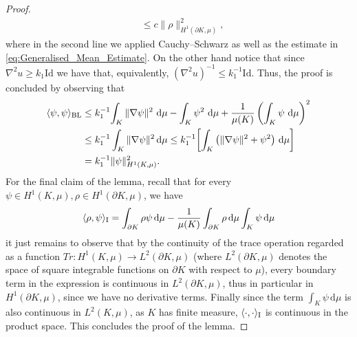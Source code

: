 \documentclass[a4paper, 11pt]{article}
\theoremstyle{definition}
\newcommand{\di}{\, \mathrm{d}}
\begin{document}
\begin{proof}
\begin{align*}
    &\leq c \|\rho\|^2_{H^{1}(\partial K,\mu)},
\end{align*}
where in the second line we applied Cauchy--Schwarz as well as the estimate in \eqref{eq:Generalised_Mean_Estimate}. On the other hand notice that since $\nabla^2u \geq k_{1}\mathrm{Id}$ we have that, equivalently, $(\nabla^2u)^{-1} \leq k^{-1}_{1}\mathrm{Id}$. Thus, the proof is concluded by observing that
\begin{align}\label{eq:Prop 3.1.1}
        \notag 
        \langle \psi,\psi \rangle_{\rm BL}
        &\leq k^{-1}_1\!\int_{K}\|\nabla \psi \|^2 \, \di\mu
            - \int_{K}\psi^2\, \di\mu
            + \frac{1}{\mu(K)}\left(\int_{K}\psi \, \di\mu\right)^2  
        \\
        \notag
        &\leq k^{-1}_1\int_{K} \|\nabla\psi\|^2 \di \mu \leq k^{-1}_1\!\left[\int_{K} \big(\|\nabla\psi\|^2 + \psi^2\big)\, \di\mu\right] 
        \\
        &= k^{-1}_1 \|\psi \|^{2}_{H^{1}(K,\mu)}.
    \end{align}
For the final claim of the lemma, recall that for every $\psi \in H^{1}(K,\mu),\rho \in H^{1}(\partial K,\mu) $, we have
\[\langle \rho, \psi\rangle_{\rm I} = \int_{\partial K} \rho\psi\di\mu -\frac{1}{\mu(K)}\int_{\partial K}\rho\di\mu\int_{K}\psi\di\mu\]
it just remains to observe that by the continuity of the trace operation regarded as a function $Tr:H^{1}(K,\mu)\rightarrow L^2(\partial K, \mu)$ (where $L^2(\partial K, \mu)$ denotes the space of square integrable functions on $\partial K$ with respect to $\mu$), every boundary term in the expression is continuous in $L^{2}(\partial K, \mu)$, thus in particular in $H^1(\partial K,\mu)$, since we have no derivative terms. Finally since the term $\int_{K}\psi \di \mu$ is also continuous in $L^2(K, \mu)$, as $K$ has finite measure, $\langle \cdot,\cdot\rangle_{\rm I}$ is continuous in the product space. This concludes the proof of the lemma.
\end{proof}
\end{document}
